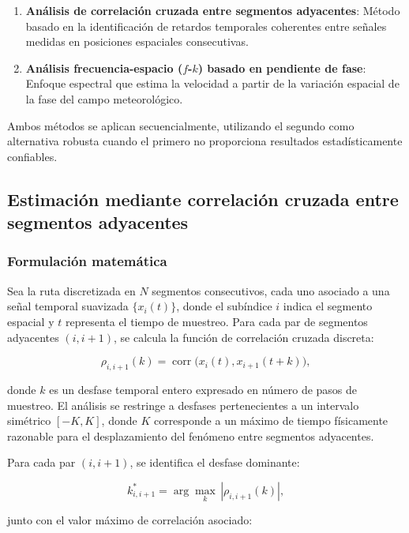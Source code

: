 \documentclass[
  spanish,
  us-letterpaper,
]{scrreprt}
\numberwithin{equation}{section}
\begin{document}
\begin{enumerate}
\def\labelenumi{\arabic{enumi}.}
\item
  \textbf{Análisis de correlación cruzada entre segmentos adyacentes}:
  Método basado en la identificación de retardos temporales coherentes
  entre señales medidas en posiciones espaciales consecutivas.
\item
  \textbf{Análisis frecuencia-espacio (\(f\)-\(k\)) basado en pendiente
  de fase}: Enfoque espectral que estima la velocidad a partir de la
  variación espacial de la fase del campo meteorológico.
\end{enumerate}

Ambos métodos se aplican secuencialmente, utilizando el segundo como
alternativa robusta cuando el primero no proporciona resultados
estadísticamente confiables.

\subsection{Estimación mediante correlación cruzada entre segmentos
adyacentes}\label{estimaciuxf3n-mediante-correlaciuxf3n-cruzada-entre-segmentos-adyacentes}

\subsubsection{Formulación
matemática}\label{formulaciuxf3n-matemuxe1tica}

Sea la ruta discretizada en \(N\) segmentos consecutivos, cada uno
asociado a una señal temporal suavizada \(\{x_i(t)\}\), donde el
subíndice \(i\) indica el segmento espacial y \(t\) representa el tiempo
de muestreo. Para cada par de segmentos adyacentes \((i, i+1)\), se
calcula la función de correlación cruzada discreta:

\[
\rho_{i,i+1}(k) = \operatorname{corr}\big(x_i(t), x_{i+1}(t+k)\big),
\]

donde \(k\) es un desfase temporal entero expresado en número de pasos
de muestreo. El análisis se restringe a desfases pertenecientes a un
intervalo simétrico \([-K, K]\), donde \(K\) corresponde a un máximo de
tiempo físicamente razonable para el desplazamiento del fenómeno entre
segmentos adyacentes.

Para cada par \((i, i+1)\), se identifica el desfase dominante:

\[
k^*_{i,i+1} = \arg\max_k \, |\rho_{i,i+1}(k)|,
\]

junto con el valor máximo de correlación asociado:
\end{document}
